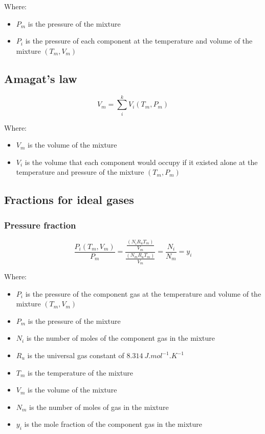 \documentclass[11pt]{article}
\begin{document}
Where:
\begin{itemize}
\item \(P_m\) is the pressure of the mixture
\item \(P_i\) is the pressure of each component at the temperature and volume of the mixture \((T_m, V_m)\)
\end{itemize}
\subsection{Amagat's law}
\label{sec:org44b3708}
\[V_m = \sum_i^k V_i (T_m, P_m)\]

Where:
\begin{itemize}
\item \(V_m\) is the volume of the mixture
\item \(V_i\) is the volume that each component would occupy if it existed alone at the temperature and pressure of the mixture \((T_m, P_m)\)
\end{itemize}
\subsection{Fractions for ideal gases}
\label{sec:org99a831c}

\subsubsection{Pressure fraction}
\label{sec:org2c1eac3}
\[\frac{P_i(T_m, V_m)}{P_m} = \frac{\frac{(N_i R_u T_m)}{V_m}}{\frac{(N_m R_u T_m)}{V_m}} = \frac{N_i}{N_m} = y_i\]

Where:
\begin{itemize}
\item \(P_i\) is the pressure of the component gas at the temperature and volume of the mixture \((T_m, V_m)\)
\item \(P_m\) is the pressure of the mixture
\item \(N_i\) is the number of moles of the component gas in the mixture
\item \(R_u\) is the universal gas constant of \(\qty{8.314}{J.mol^{-1}.K^{-1}}\)
\item \(T_m\) is the temperature of the mixture
\item \(V_m\) is the volume of the mixture
\item \(N_m\) is the number of moles of gas in the mixture
\item \(y_i\) is the mole fraction of the component gas in the mixture
\end{itemize}
\end{document}
